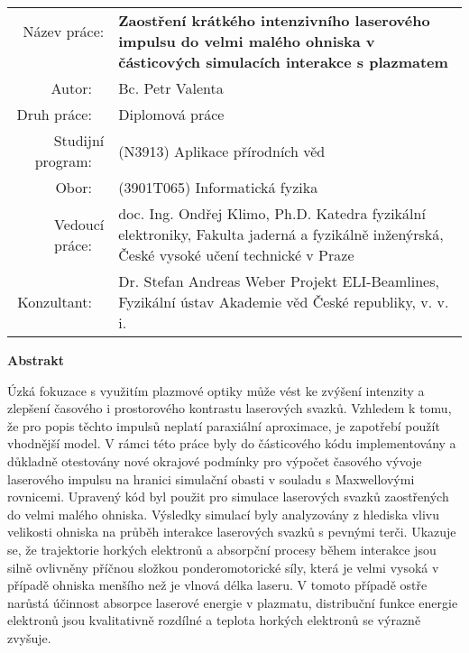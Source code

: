 \documentclass[12pt, twoside, a4paper, openright]{report}
\newcommand{\projecttitlecz}{Zaostření krátkého intenzivního laserového impulsu do velmi malého ohniska v částicových simulacích interakce s plazmatem }
\newcommand{\valenta}{Bc. Petr Valenta }
\newcommand{\klimo}{doc. Ing. Ondřej Klimo, Ph.D. }
\newcommand{\weber}{Dr. Stefan Andreas Weber }
\begin{document}

\newpage
\thispagestyle{empty}
\mbox{}


\newpage
\begin{flushleft}
	\renewcommand{\arraystretch}{1.3}
	\begin{tabular}{r p{12cm}}
		Název práce:
		~ & \bf \projecttitlecz \\
		Autor:
		~ & \valenta \\
		Druh práce:
		~ & Diplomová práce \\
		Studijní program:
		~ & (N3913) Aplikace přírodních věd \\
		Obor:
		~ & (3901T065) Informatická fyzika \\
		Vedoucí práce:
		~ & \klimo \newline Katedra fyzikální elektroniky, Fakulta jaderná a fyzikálně inženýrská, České vysoké učení technické v Praze \\
		Konzultant:
		~ & \weber \newline Projekt ELI-Beamlines, Fyzikální ústav Akademie věd České republiky, v. v. i. \\
	\end{tabular}
\end{flushleft}

\begin{center}
\textbf{Abstrakt}\\
\end{center}

Úzká fokuzace s využitím plazmové optiky může vést ke zvýšení intenzity a zlepšení časového i prostorového kontrastu laserových svazků. Vzhledem k tomu, že pro popis těchto impulsů neplatí paraxiální aproximace, je zapotřebí použít vhodnější model. V rámci této práce byly do částicového kódu implementovány a důkladně otestovány nové okrajové podmínky pro výpočet časového vývoje laserového impulsu na hranici simulační obasti v souladu s Maxwellovými rovnicemi. Upravený kód byl použit pro simulace laserových svazků zaostřených do velmi malého ohniska. Výsledky simulací byly analyzovány z hlediska vlivu velikosti ohniska na průběh interakce laserových svazků s pevnými terči. Ukazuje se, že trajektorie horkých elektronů a absorpční procesy během interakce jsou silně ovlivněny příčnou složkou ponderomotorické síly, která je velmi vysoká v případě ohniska menšího než je vlnová délka laseru. V tomoto případě ostře narůstá účinnost absorpce laserové energie v plazmatu, distribuční funkce energie elektronů jsou kvalitativně rozdílné a teplota horkých elektronů se výrazně zvyšuje. \\
\end{document}
